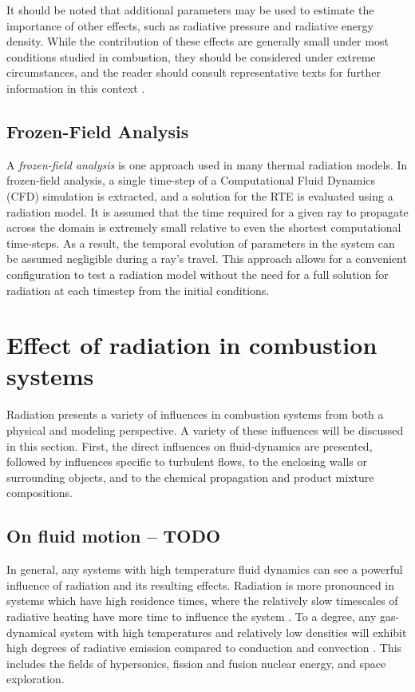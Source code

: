 It should be noted that additional parameters may be used to estimate the importance of other effects, such as radiative pressure and radiative energy density.
While the contribution of these effects are generally small under most conditions studied in combustion, they should be considered under extreme circumstances, and the reader should consult representative texts for further information in this context \cite{Pai1966RadiationDynamics}.

\subsection{Frozen-Field Analysis}
A \textit{frozen-field analysis} is one approach used in many thermal radiation models. In frozen-field analysis, a single time-step of a Computational Fluid Dynamics (CFD) simulation is extracted, and a solution for the RTE is evaluated using a radiation model.
It is assumed that the time required for a given ray to propagate across the domain is extremely small relative to even the shortest computational time-steps.
As a result, the temporal evolution of parameters in the system can be assumed negligible during a ray's travel.
This approach allows for a convenient configuration to test a radiation model without the need for a full solution for radiation at each timestep from the initial conditions.

\section{Effect of radiation in combustion systems}
Radiation presents a variety of influences in combustion systems from both a physical and modeling perspective. A variety of these influences will be discussed in this section. 
First, the direct influences on fluid-dynamics are presented, followed by influences specific to turbulent flows, to the enclosing walls or surrounding objects, and to the chemical propagation and product mixture compositions.

\subsection{On fluid motion – TODO}
In general, any systems with high temperature fluid dynamics can see a powerful influence of radiation and its resulting effects. 
Radiation is more pronounced in systems which have high residence times, where the relatively slow timescales of radiative heating have more time to influence the system \cite{Wu2021LimitationsFires}. 
To a degree, any gas-dynamical system with high temperatures and relatively low densities will exhibit high degrees of radiative emission compared to conduction and convection \cite{Pai1966RadiationDynamics}. This includes the fields of hypersonics, fission and fusion nuclear energy, and space exploration.

